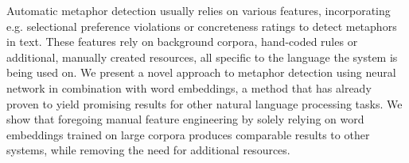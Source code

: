 Automatic metaphor detection usually relies on various features, incorporating e.g. selectional preference violations or concreteness ratings to detect metaphors in text. These features rely on background corpora, hand-coded rules or additional, manually created resources, all specific to the language the system is being used on. We present a novel approach to metaphor detection using neural network in combination with word embeddings, a method that has already proven to yield promising results for other natural language processing tasks. We show that foregoing manual feature engineering by solely relying on word embeddings trained on large corpora produces comparable results to other systems, while removing the need for additional resources.
